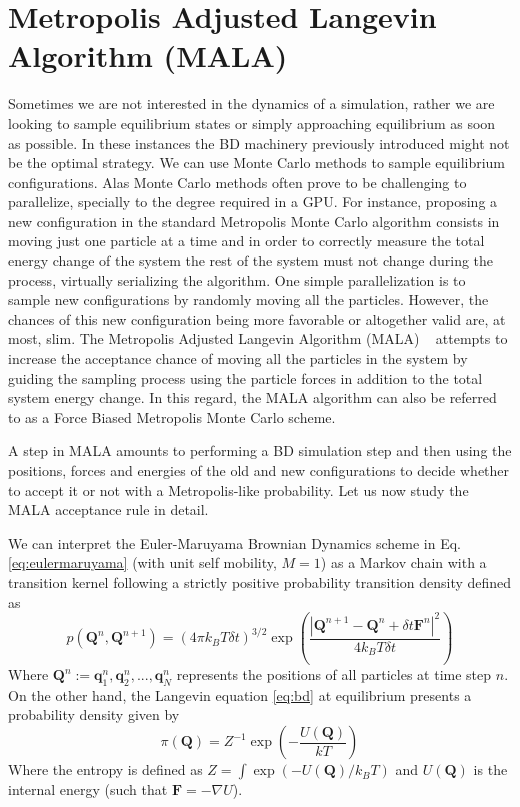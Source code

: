 \documentclass[twoside,openright,titlepage,numbers=noenddot,%
headinclude,footinclude,cleardoublepage=empty,abstract=on,
BCOR=5mm,fontsize=11pt, dvipsnames, paper=b5
]{scrreprt}
\renewcommand{\vec}[1]{\bm{#1}}
\newcommand{\gpu}{\gls{GPU}\xspace}
\newcommand{\dt}{\delta t}
\newcommand{\kT}{k_B T}
\newcommand{\ppos}{q}
\begin{document}
\section{Metropolis Adjusted Langevin Algorithm (MALA)}
Sometimes we are not interested in the dynamics of a simulation, rather we are looking to sample equilibrium states or simply approaching equilibrium as soon as possible. In these instances the \gls{BD} machinery previously introduced might not be the optimal strategy. We can use Monte Carlo methods to sample equilibrium configurations. Alas Monte Carlo methods often prove to be challenging to parallelize, specially to the degree required in a \gpu. For instance, proposing a new configuration in the standard Metropolis Monte Carlo algorithm consists in moving just one particle at a time and in order to correctly measure the total energy change of the system the rest of the system must not change during the process, virtually serializing the algorithm. One simple parallelization is to sample new configurations by randomly moving all the particles. However, the chances of this new configuration being more favorable or altogether valid are, at most, slim.
The Metropolis Adjusted Langevin Algorithm (MALA) ~\cite{Bou2010} attempts to increase the acceptance chance of moving all the particles in the system by guiding the sampling process using the particle forces in addition to the total system energy change. In this regard, the MALA algorithm can also be referred to as a Force Biased Metropolis Monte Carlo scheme.

 A step in MALA amounts to performing a \gls{BD} simulation step and then using the positions, forces and energies of the old and new configurations to decide whether to accept it or not with a Metropolis-like probability. Let us now study the MALA acceptance rule in detail.

We can interpret the Euler-Maruyama Brownian Dynamics scheme in Eq. \eqref{eq:eulermaruyama} (with unit self mobility, $M=1$) as a Markov chain with a transition kernel following a strictly positive probability transition density defined as
\begin{equation}
  \label{eq:malakernel}
  p( \vec{Q}^n, \vec{Q}^{n+1}) = (4\pi \kT\dt)^{3/2}\exp\left(\frac{\left|\vec{Q}^{n+1} - \vec{Q}^n + \dt\vec{F}^n\right|^2}{4\kT\dt}\right)
\end{equation}
Where $\vec{Q}^n:={\vec{\ppos}_1^n, \vec{\ppos}^n_2, ..., \vec{\ppos}^n_N}$ represents the positions of all particles at time step $n$.
On the other hand, the Langevin equation \eqref{eq:bd} at equilibrium presents a probability density given by
\begin{equation}
  \label{eq:malatarget}
  \pi(\vec{Q}) = Z^{-1}\exp\left(-\frac{U(\vec{Q})}{kT}\right)
\end{equation}
Where the entropy is defined as $Z = \int\exp\left(-U(\vec{Q})/\kT\right)$ and $U(\vec{Q})$ is the internal energy (such that $\vec{F} = -\nabla U$).
\end{document}
